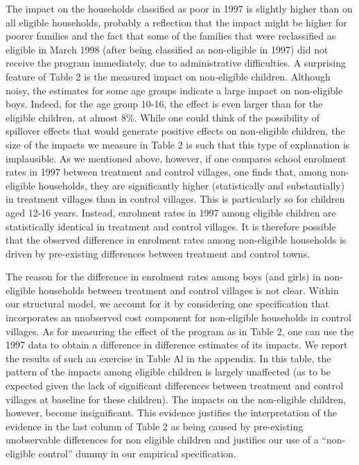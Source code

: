\documentclass{handoutForSolutions}
\begin{document}
The impact on the households classified as poor in 1997 is slightly higher than on all eligible households, probably a reflection that the impact might be higher for poorer families and the fact that some of the families that were reclassified as eligible in March 1998 (after being classified as non-eligible in 1997) did not receive the program immediately, due to administrative difficulties. A surprising feature of Table 2 is the measured impact on non-eligible children. Although noisy, the estimates for some age groups indicate a large impact on non-eligible boys. Indeed, for the age group 10-16, the effect is even larger than for the eligible children, at almost 8\%. While one could think of the possibility of spillover effects that would generate positive effects on non-eligible children, the size of the impacts we measure in Table 2 is such that this type of explanation is implausible. As we mentioned above, however, if one compares school enrolment rates in 1997 between treatment and control villages, one finds that, among non- eligible households, they are significantly higher (statistically and substantially) in treatment villages than in control villages. This is particularly so for children aged 12-16 years. Instead, enrolment rates in 1997 among eligible children are statistically identical in treatment and control villages. It is therefore possible that the observed difference in enrolment rates among non-eligible households is driven by pre-existing differences between treatment and control towns.

The reason for the difference in enrolment rates among boys (and girls) in non-eligible households between treatment and control villages is not clear. Within our structural model, we account for it by considering one specification that incorporates an unobserved cost component for non-eligible households in control villages. As for measuring the effect of the program as in Table 2, one can use the 1997 data to obtain a difference in difference estimates of its impacts. We report the results of such an exercise in Table Al in the appendix. In this table, the pattern of the impacts among eligible children is largely unaffected (as to be expected given the lack of significant differences between treatment and control villages at baseline for these children). The impacts on the non-eligible children, however, become insignificant. This evidence justifies the interpretation of the evidence in the last column of Table 2 as being caused by pre-existing unobservable differences for non eligible children and justifies our use of a ``non-eligible control'' dummy in our empirical specification.
\end{document}
